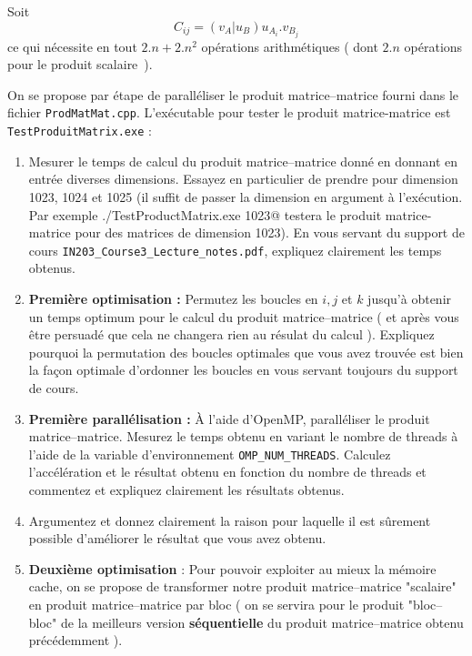 \documentclass[11pt,a4paper]{article}
\begin{document}
Soit
\[
C_{ij} = \left(v_{A}|u_{B}\right)u_{A_{i}}.v_{B_{j}}
\]
ce qui nécessite en tout $2.n+2.n^{2}$ opérations arithmétiques ( dont $2.n$ opérations pour le produit scalaire~).

On se propose par étape de paralléliser le produit matrice--matrice fourni dans le fichier \texttt{ProdMatMat.cpp}. L'exécutable pour tester le produit matrice-matrice est \texttt{TestProduitMatrix.exe} :

\begin{enumerate}
	\item Mesurer le temps de calcul du produit matrice--matrice donné en donnant en entrée diverses dimensions. Essayez en particulier de prendre pour dimension 1023, 1024 et 1025 (il suffit de passer la dimension en argument à l'exécution. Par exemple \verb@./TestProductMatrix.exe 1023@ testera le produit matrice-matrice pour des matrices de dimension 1023). En vous servant du support
	de cours \texttt{IN203\_Course3\_Lecture\_notes.pdf}, expliquez clairement les temps obtenus.
	\item \textbf{\color{blue}Première optimisation :} Permutez les  boucles en $i,j$ et $k$ jusqu'à obtenir un temps optimum pour le calcul du produit matrice--matrice ( et après vous être persuadé que cela ne changera rien au résulat du calcul ). Expliquez pourquoi la permutation des boucles optimales que vous avez trouvée
	est bien la façon optimale d'ordonner les boucles en vous servant toujours du support de cours.
	\item \textbf{\color{blue}Première parallélisation : } \`A l'aide d'OpenMP, paralléliser le produit matrice--matrice. Mesurez le temps obtenu en variant le nombre de threads à l'aide de la variable d'environnement \texttt{OMP\_NUM\_THREADS}. Calculez l'accélération et le résultat obtenu en fonction du nombre de threads et commentez et expliquez clairement les résultats obtenus. 
	\item Argumentez et donnez clairement la raison pour laquelle il est sûrement possible d'améliorer le
	résultat que vous avez obtenu.
	\item \textbf{\color{blue}Deuxième optimisation }: 
	Pour pouvoir exploiter au mieux la mémoire cache, on se propose de transformer notre produit matrice--matrice "scalaire" en produit matrice--matrice par bloc ( on se servira pour le produit "bloc--bloc" de la meilleurs version \textbf{séquentielle} du produit matrice--matrice obtenu précédemment ).


\end{enumerate}
\end{document}
